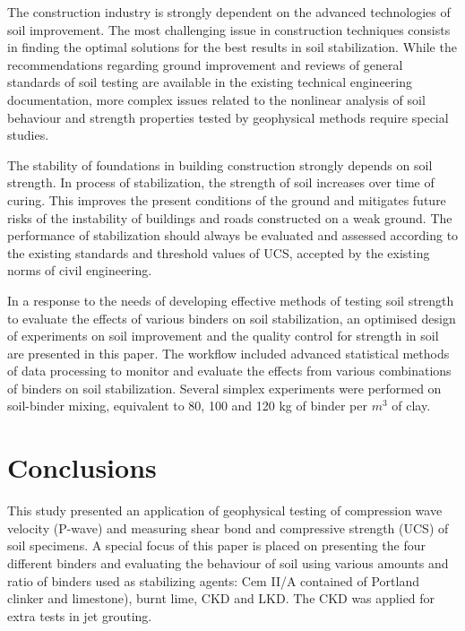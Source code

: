 \documentclass[USenglish,twocolumn]{article}
\begin{document}
The construction industry is strongly dependent on the advanced technologies of soil improvement. The most challenging issue in construction techniques consists in finding the optimal solutions for the best results in soil stabilization. While the recommendations regarding ground improvement and reviews of general standards of soil testing are available in the existing technical engineering documentation, more complex issues related to the nonlinear analysis of soil behaviour and strength properties tested by geophysical methods require special studies.  

The stability of foundations in building construction strongly depends on soil strength. In process of stabilization, the strength of soil increases over time of curing. This improves the present conditions of the ground and mitigates future risks of the instability of buildings and roads constructed on a weak ground. The performance of stabilization should always be evaluated and assessed according to the existing standards and threshold values of UCS, accepted by the existing norms of civil engineering. 

In a response to the needs of developing effective methods of testing soil strength to evaluate the effects of various binders on soil stabilization, an optimised design of experiments on soil improvement and the quality control for strength in soil are presented in this paper. The workflow included advanced statistical methods of data processing to monitor and evaluate the effects from various combinations of binders on soil stabilization. Several simplex experiments were performed on soil-binder mixing, equivalent to 80, 100 and 120 kg of binder per $m^3$ of clay.

\section{Conclusions}

 This study presented an application of geophysical testing of compression wave velocity (P-wave) and measuring shear bond and compressive strength (UCS) of soil specimens. A special focus of this paper is placed on presenting the four different binders and evaluating the behaviour of soil using various amounts and ratio of binders used as stabilizing agents: Cem II/A contained of Portland clinker and limestone), burnt lime, CKD and LKD. The CKD was applied for extra tests in jet grouting. 
\end{document}
